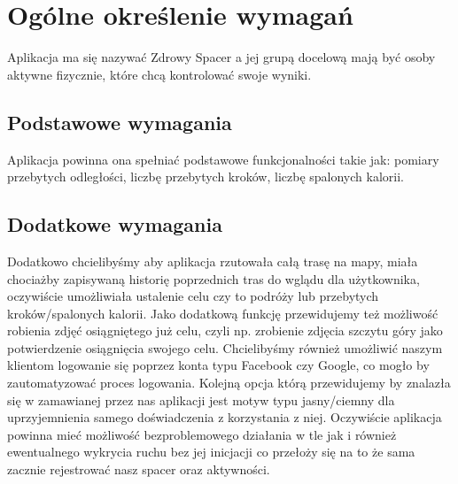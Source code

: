 	\newpage
\section{Ogólne określenie wymagań}		%

Aplikacja ma się nazywać Zdrowy Spacer a jej grupą docelową mają być osoby aktywne fizycznie, które chcą kontrolować swoje wyniki.


\subsection{Podstawowe wymagania}  %

\hspace{1cm} Aplikacja powinna ona spełniać podstawowe funkcjonalności takie jak: pomiary przebytych odległości, liczbę przebytych kroków, liczbę spalonych kalorii.%

\subsection{Dodatkowe wymagania}  %

\hspace{1cm} Dodatkowo chcielibyśmy aby aplikacja rzutowała całą trasę na mapy, miała chociażby zapisywaną historię poprzednich tras do wglądu dla użytkownika, oczywiście umożliwiała ustalenie celu czy to podróży lub przebytych kroków/spalonych kalorii. Jako dodatkową funkcję przewidujemy też możliwość robienia zdjęć osiągniętego już celu, czyli np. zrobienie zdjęcia szczytu góry jako potwierdzenie osiągnięcia swojego celu. Chcielibyśmy również umożliwić naszym klientom logowanie się poprzez konta typu Facebook czy Google, co mogło by zautomatyzować proces logowania. Kolejną opcja którą przewidujemy by znalazła się w zamawianej przez nas aplikacji jest motyw typu jasny/ciemny dla uprzyjemnienia samego doświadczenia z korzystania z niej. Oczywiście aplikacja powinna mieć możliwość bezproblemowego działania w tle jak i również ewentualnego wykrycia ruchu bez jej inicjacji co przełoży się na to że sama zacznie rejestrować nasz spacer oraz aktywności.



